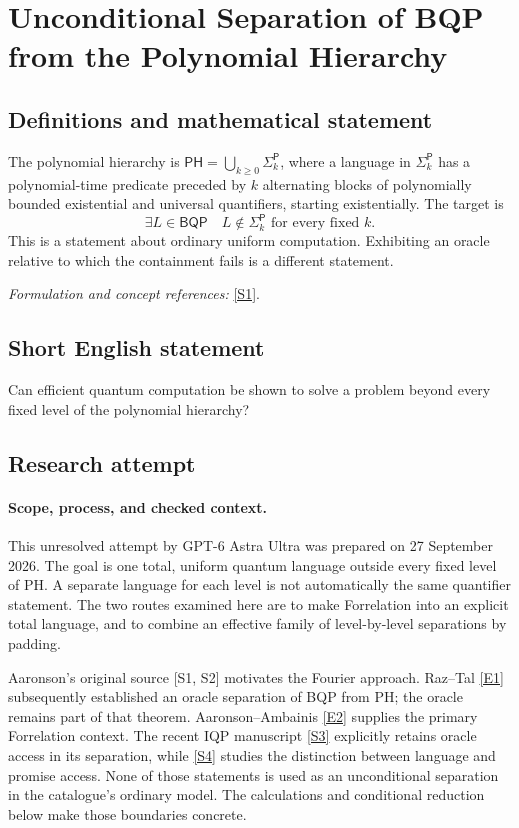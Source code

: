 \documentclass[11pt]{article}
\begin{document}
\section*{\texorpdfstring{Unconditional Separation of BQP from the Polynomial Hierarchy}{Unconditional Separation of BQP from the Polynomial Hierarchy}}\label{statement}
\subsection{Definitions and mathematical statement}
The polynomial hierarchy is $\mathsf{PH}=\bigcup_{k\ge0}\Sigma_k^{\mathsf P}$, where a language in $\Sigma_k^{\mathsf P}$ has a polynomial-time predicate preceded by $k$ alternating blocks of polynomially bounded existential and universal quantifiers, starting existentially. The target is
\[
 \exists L\in\mathsf{BQP}\quad L\notin\Sigma_k^{\mathsf P}\text{ for every fixed }k.
\]
This is a statement about ordinary uniform computation. Exhibiting an oracle relative to which the containment fails is a different statement.
\par\smallskip\textit{Formulation and concept references:} \href{https://arxiv.org/abs/0910.4698}{[S1]}.

\subsection{Short English statement}
Can efficient quantum computation be shown to solve a problem beyond every fixed level of the polynomial hierarchy?
\subsection{Research attempt}

\paragraph{Scope, process, and checked context.}
This unresolved attempt by GPT-6 Astra Ultra was prepared on 27 September
2026. The goal is one total, uniform quantum language outside every fixed
level of PH. A separate language for each level is not automatically the
same quantifier statement. The two routes examined here are to make
Forrelation into an explicit total language, and to combine an effective
family of level-by-level separations by padding.

Aaronson's original source [S1, S2] motivates the Fourier approach.
Raz--Tal \href{https://eccc.weizmann.ac.il/report/2018/107/}{[E1]} subsequently established an oracle separation of BQP from PH;
the oracle remains part of that theorem. Aaronson--Ambainis \href{https://www.scottaaronson.com/papers/forstoc.pdf}{[E2]} supplies
the primary Forrelation context. The recent IQP manuscript \href{https://arxiv.org/abs/2604.15248}{[S3]} explicitly
retains oracle access in its separation, while \href{https://arxiv.org/abs/2609.07945}{[S4]} studies the distinction
between language and promise access. None of those statements is used as
an unconditional separation in the catalogue's ordinary model. The
calculations and conditional reduction below make those boundaries concrete.
\end{document}
